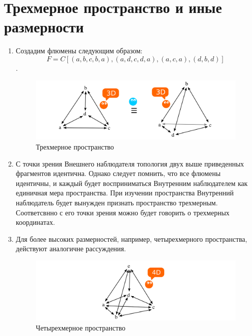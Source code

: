\documentclass[final]{article}
\begin{document}
    \section{Трехмерное пространство и иные размерности}
        \begin{enumerate}
            \item Создадим флюмены следующим образом: \[ F = 
            C[(a,b,c,b,a), (a,d,c,d,a), (a,c,a), (d,b,d)] \].

            \begin{figure}[H]
                \centering
                \includegraphics[width=\textwidth]{./3d-f1f2f3f4f5.png}
                \caption{Трехмерное пространство }
                \label{fig:image}
            \end{figure}

            \item С точки зрения Внешнего наблюдателя топология двух выше 
            приведенных фрагментов идентична. Однако следует помнить, что все 
            флюмены идентичны, и каждый будет восприниматься Внутренним наблюдателем 
            как единичная мера пространства. При изучении пространства Внутренний 
            наблюдатель будет вынужден признать пространство трехмерным. 
            Соответсвнно с его точки зрения можно будет говорить о трехмерных 
            координатах.

            \item Для более высоких размерностей, например, четырехмерного 
            пространства, действуют аналогичне рассуждения.

            \begin{figure}[H]
                \centering
                \includegraphics[width=\textwidth]{./4d.png}
                \caption{Четырехмерное пространство }
                \label{fig:image}
            \end{figure}

        \end{enumerate}
\end{document}
